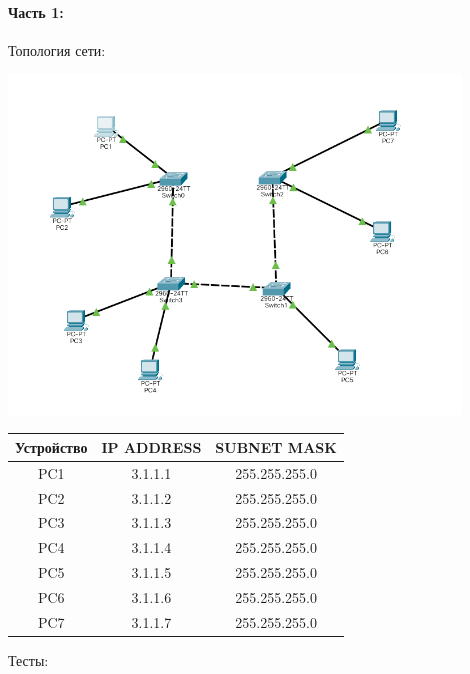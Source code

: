 \paragraph{Часть 1:}
Топология сети:

\includegraphics[width=0.9\textwidth]{resources/topology1}

\begin{center}
    \begin{tabular}{|c|c|c|}
        \hline
        Устройство & IP ADDRESS & SUBNET MASK   \\
        \hline
        PC1        & 3.1.1.1    & 255.255.255.0 \\
        PC2        & 3.1.1.2    & 255.255.255.0 \\
        PC3        & 3.1.1.3    & 255.255.255.0 \\
        PC4        & 3.1.1.4    & 255.255.255.0 \\
        PC5        & 3.1.1.5    & 255.255.255.0 \\
        PC6        & 3.1.1.6    & 255.255.255.0 \\
        PC7        & 3.1.1.7    & 255.255.255.0 \\
        \hline
    \end{tabular}
\end{center}

Тесты:


